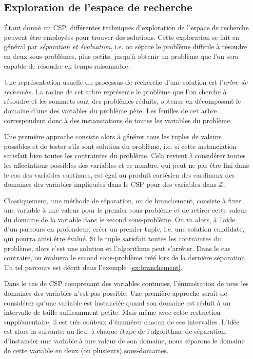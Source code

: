 \subsection{Exploration de l'espace de recherche}
\label{sec:PPC_rech}

{\'E}tant donné un CSP, différentes techniques d'exploration de
l'espace de recherche peuvent être employées pour trouver des
solutions. Cette exploration se fait en général par {\it séparation et
  évaluation}, i.e. on sépare le problème difficile à résoudre en deux
sous-problèmes, plus petits, jusqu'à obtenir un problème que l'on sera
capable de résoudre en temps raisonnable.  

Une représentation usuelle du processus de recherche d'une solution
est l'{\it arbre de recherche}. La racine de cet arbre représente le
problème que l'on cherche à résoudre et les sommets sont des problèmes
réduits, obtenus en décomposant le domaine d'une des variables du
problème père. Les feuilles de cet arbre correspondent donc à des
instanciations de toutes les variables du problème.

Une première approche consiste alors à générer tous les
tuples de valeurs possibles et de tester s'ils sont solution du
problème, i.e. si cette instanciation satisfait bien toutes les
contraintes du problème. Cela revient à considérer toutes les
affectations possibles des variables et ce nombre, qui peut ne pas
être fini dans le cas des variables continues, est égal au produit
cartésien des cardinaux des domaines des variables impliquées dans le
CSP pour des variables dans $\mathbb{Z}$.

Classiquement, une méthode de séparation, ou de branchement, consiste
à fixer une variable à une valeur pour le premier sous-problème et de
retirer cette valeur du domaine de la variable dans le second
sous-problème. On va alors, à l'aide d'un parcours en profondeur, créer
un premier tuple, i.e. une solution candidate, qui pourra ainsi être
évalué. Si le tuple satisfait toutes les contraintes du problème,
alors c'est une solution et l'algorithme peut s'arrêter. Dans le cas 
contraire, on évaluera le second sous-problème créé lors de la
dernière séparation. Un tel parcours est décrit dans
l'exemple~\ref{ex:branchement}.

Dans le cas de CSP comprenant des variables continues, l'énumération
de tous les domaines des variables n'est pas possible. Une première
approche serait de considérer qu'une variable est instanciée quand son
domaine est réduit à un intervalle de taille suffisamment petite. Mais
même avec cette restriction supplémentaire, il est très coûteux
d'énumérer chacun de ces intervalles. L'idée est alors la suivante: au
lieu, à chaque étape de l'algorithme de séparation, d'instancier une
variable à une valeur de son domaine, nous séparons le domaine de
cette variable en deux (ou plusieurs) sous-domaines.

